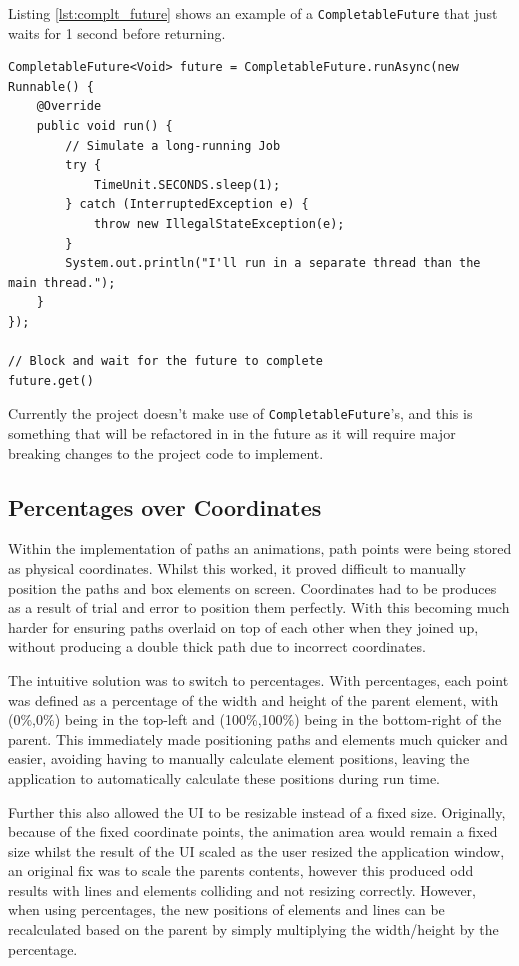 Listing \ref{lst:complt_future} shows an example of a \texttt{CompletableFuture} that just waits for 1 second before returning.

\begin{lstlisting}[caption=Example completable future code from CalliCoder.com \cite{singh_2022_java}, label=lst:complt_future]
CompletableFuture<Void> future = CompletableFuture.runAsync(new Runnable() {
    @Override
    public void run() {
        // Simulate a long-running Job
        try {
            TimeUnit.SECONDS.sleep(1);
        } catch (InterruptedException e) {
            throw new IllegalStateException(e);
        }
        System.out.println("I'll run in a separate thread than the main thread.");
    }
});

// Block and wait for the future to complete
future.get()
\end{lstlisting}

Currently the project doesn't make use of \texttt{CompletableFuture}'s, and this is something that will be refactored in in the future as it will require major breaking changes to the project code to implement.

\subsection{Percentages over Coordinates}
Within the implementation of paths an animations, path points were being stored as physical coordinates. Whilst this worked, it proved difficult to manually position the paths and box elements on screen. Coordinates had to be produces as a result of trial and error to position them perfectly. With this becoming much harder for ensuring paths overlaid on top of each other when they joined up, without producing a double thick path due to incorrect coordinates.

The intuitive solution was to switch to percentages. With percentages, each point was defined as a percentage of the width and height of the parent element, with (0\%,0\%) being in the top-left and (100\%,100\%) being in the bottom-right of the parent. This immediately made positioning paths and elements much quicker and easier, avoiding having to manually calculate element positions, leaving the application to automatically calculate these positions during run time.

Further this also allowed the \ac{UI} to be resizable instead of a fixed size. Originally, because of the fixed coordinate points, the animation area would remain a fixed size whilst the result of the \ac{UI} scaled as the user resized the application window, an original fix was to scale the parents contents, however this produced odd results with lines and elements colliding and not resizing correctly. However, when using percentages, the new positions of elements and lines can be recalculated based on the parent by simply multiplying the width/height by the percentage.

